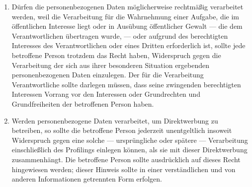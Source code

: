 \begin{enumerate}

   \item Dürfen die personenbezogenen Daten möglicherweise rechtmäßig verarbeitet werden, weil die Verarbeitung für die
    Wahrnehmung einer Aufgabe, die im öffentlichen Interesse liegt oder in Ausübung öffentlicher Gewalt — die dem
    Verantwortlichen übertragen wurde, — oder aufgrund des berechtigten Interesses des Verantwortlichen oder eines
    Dritten erforderlich ist, sollte jede betroffene Person trotzdem das Recht haben, Widerspruch gegen die
    Verarbeitung der sich aus ihrer besonderen Situation ergebenden personenbezogenen Daten einzulegen. Der für die
    Verarbeitung Verantwortliche sollte darlegen müssen, dass seine zwingenden berechtigten Interessen Vorrang vor den
    Interessen oder Grundrechten und Grundfreiheiten der betroffenen Person haben.%
   \label{itm:eg-69}
   

   \item Werden personenbezogene Daten verarbeitet, um Direktwerbung zu betreiben, so sollte die betroffene Person
    jederzeit unentgeltlich insoweit Widerspruch gegen eine solche — ursprüngliche oder spätere — Verarbeitung
    einschließlich des Profilings einlegen können, als sie mit dieser Direktwerbung zusammenhängt. Die betroffene
    Person sollte ausdrücklich auf dieses Recht hingewiesen werden; dieser Hinweis sollte in einer verständlichen und
    von anderen Informationen getrennten Form erfolgen.%
   \label{itm:eg-70}
   


\end{enumerate}

